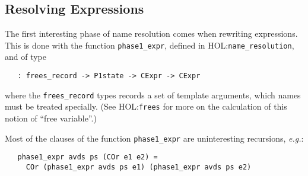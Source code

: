 \documentclass[11pt]{article}
\newcommand{\eg}{\emph{e.g.}}
\newcommand{\HOLfile}[1]{HOL:\texttt{#1}}
\begin{document}
\subsection{Resolving Expressions}

The first interesting phase of name resolution comes when rewriting
expressions.   This is done
with the function \texttt{phase1_expr}, defined in
\HOLfile{name_resolution}, and of type
\begin{verbatim}
   : frees_record -> P1state -> CExpr -> CExpr
\end{verbatim}
where the \texttt{frees_record} types records a set of template
arguments, which names must be treated specially.  (See
\HOLfile{frees} for more on the calculation of this notion of ``free
variable''.)

Most of the clauses of the function \texttt{phase1_expr} are
uninteresting recursions, \eg:
\begin{verbatim}
   phase1_expr avds ps (COr e1 e2) =
     COr (phase1_expr avds ps e1) (phase1_expr avds ps e2)
\end{verbatim}
\end{document}
